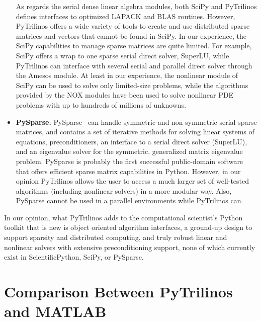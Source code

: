 \documentclass[acmtocl]{acmtrans2m}
\begin{document}
\begin{itemize}
  As regards the
  serial dense linear algebra modules, both SciPy and PyTrilinos defines
  interfaces to optimized LAPACK and BLAS routines. However, PyTrilinos offers
  a wide variety of tools to create and use distributed sparse matrices and
  vectors that cannot be found in SciPy. In our experience, the SciPy capabilities to manage sparse matrices
  are quite limited. For example, SciPy offers a wrap to one sparse serial
  direct solver, SuperLU, while
  PyTrilinos can interface with several serial and parallel direct solver
  through the Amesos module. At least in our experience, the nonlinear module
  of SciPy can be used to solve only limited-size problems, while the
  algorithms provided by the NOX modules have been used to solve nonlinear PDE
  problems with up to hundreds of millions of unknowns.

\item {\bf PySparse.}  PySparse~\cite{broker05using} can handle
  symmetric and non-symmetric serial sparse matrices, and contains a
  set of iterative methods for solving linear systems of equations,
  preconditioners, an interface to a serial direct solver (SuperLU),
  and an eigenvalue solver for the symmetric, generalized matrix
  eigenvalue problem.  PySparse is probably the first successful
  public-domain software that offers efficient sparse matrix
  capabilities in Python. However, in our opinion PyTrilinos allows
  the user to access a much larger set of well-tested algorithms
  (including nonlinear solvers) in a more modular way.  Also,
  PySparse cannot be used in a parallel environments while PyTrilinos
  can.

\end{itemize}

In our opinion, what PyTrilinos adds to the computational scientist's Python
toolkit that is new is object oriented algorithm interfaces, a ground-up
design to support sparsity and distributed computing, and truly robust
linear and nonlinear solvers with extensive preconditioning support, none of
which currently exist in ScientificPython, SciPy, or PySparse.

\section{Comparison Between PyTrilinos and MATLAB}
\label{sec:comparison_matlab}
\end{document}

